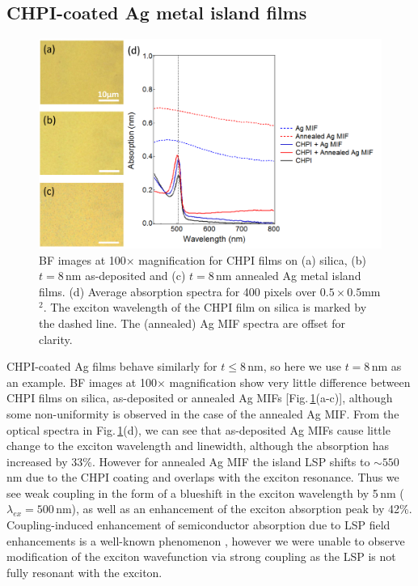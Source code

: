\subsection{CHPI-coated Ag metal island films}
\label{sec:CHPI_AgMIF}
\begin{figure}[h!] 
\centering    
\includegraphics[width=\textwidth]{Fig7}
\caption{BF images at 100$\times$ magnification for CHPI films on (a) silica, (b) $t=8$\,nm as-deposited and (c) $t=8$\,nm annealed Ag metal island films. (d) Average absorption spectra for 400 pixels over $0.5\times0.5$mm$^2$. The exciton wavelength of the CHPI film on silica is marked by the dashed line. The (annealed) Ag MIF spectra are offset for clarity.}
\label{6Fig7}
\end{figure}
CHPI-coated Ag films behave similarly for $t\leq8$\,nm, so here we use $t=8$\,nm as an example. BF images at 100$\times$ magnification show very little difference between CHPI films on silica, as-deposited or annealed Ag MIFs [Fig.\,\ref{6Fig7}(a-c)], although some non-uniformity is observed in the case of the annealed Ag MIF. From the optical spectra in Fig.\,\ref{6Fig7}(d), we can see that as-deposited Ag MIFs cause little change to the exciton wavelength and linewidth, although the absorption has increased by 33\%. However for annealed Ag MIF the island LSP shifts to $\sim550$\,nm due to the CHPI coating and overlaps with the exciton resonance. Thus we see weak coupling in the form of a blueshift in the exciton wavelength by 5\,nm  ($\lambda_{ex}=500$\,nm), as well as an enhancement of the exciton absorption peak by 42\%. Coupling-induced enhancement of semiconductor absorption due to LSP field enhancements is a well-known phenomenon \cite{Balci2014, Alemu2014, Zheng2011, Xu2013, Spinelli2012}, however we were unable to observe modification of the exciton wavefunction via strong coupling as the LSP is not fully resonant with the exciton.


